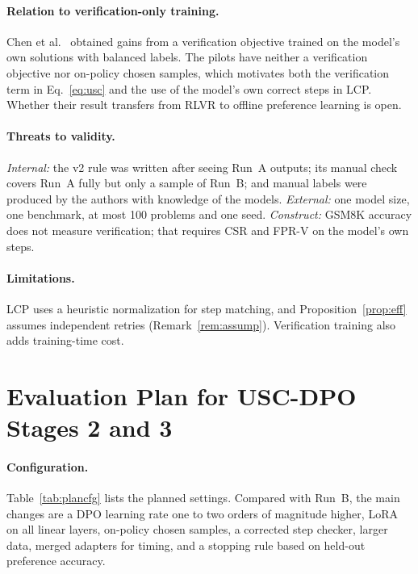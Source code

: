 \documentclass[11pt, a4paper]{article}
\begin{document}
\paragraph{Relation to verification-only training.} Chen et al.~\cite{chen2026selfverify} obtained gains from a verification objective trained on the model's own solutions with balanced labels. The pilots have neither a verification objective nor on-policy chosen samples, which motivates both the verification term in Eq.~\eqref{eq:usc} and the use of the model's own correct steps in LCP. Whether their result transfers from RLVR to offline preference learning is open.

\paragraph{Threats to validity.} \emph{Internal:} the v2 rule was written after seeing Run~A outputs; its manual check covers Run~A fully but only a sample of Run~B; and manual labels were produced by the authors with knowledge of the models. \emph{External:} one model size, one benchmark, at most 100 problems and one seed. \emph{Construct:} GSM8K accuracy does not measure verification; that requires CSR and FPR-V on the model's own steps.

\paragraph{Limitations.} LCP uses a heuristic normalization for step matching, and Proposition~\ref{prop:eff} assumes independent retries (Remark~\ref{rem:assump}). Verification training also adds training-time cost.

\section{Evaluation Plan for USC-DPO Stages 2 and 3}
\label{sec:plan}
\paragraph{Configuration.} Table~\ref{tab:plancfg} lists the planned settings. Compared with Run~B, the main changes are a DPO learning rate one to two orders of magnitude higher, LoRA on all linear layers, on-policy chosen samples, a corrected step checker, larger data, merged adapters for timing, and a stopping rule based on held-out preference accuracy.
\end{document}
